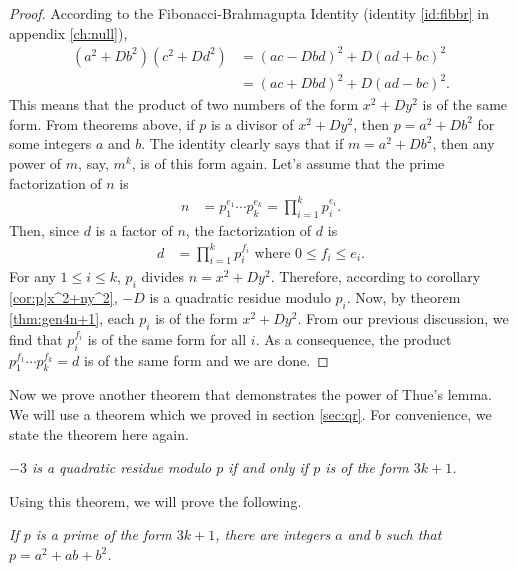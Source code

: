 \documentclass{subfile}
\begin{document}
	\begin{proof}
		According to the Fibonacci-Brahmagupta Identity (identity \autoref{id:fibbr} in appendix \autoref{ch:null}),
			\begin{align*}
				(a^2+Db^2)(c^2+Dd^2)& =(ac-Dbd)^2+D(ad+bc)^2\\
				& =(ac+Dbd)^2+D(ad-bc)^2.
			\end{align*}
		This means that the product of two numbers of the form $x^2+Dy^2$ is of the same form. From theorems above, if $p$ is a divisor of $x^2+Dy^2$, then $p=a^2+Db^2$ for some integers $a$ and $b$. The identity clearly says that if $m=a^2+Db^2$, then any power of $m$, say, $m^k$, is of this form again. Let's assume that the prime factorization of $n$ is
			\begin{align*}
				n & = p_1^{e_1}\cdots p_k^{e_k} = \prod_{i=1}^{k}p_i^{e_i}.
			\end{align*}
		Then, since $d$ is a factor of $n$, the factorization of $d$ is
			\begin{align*}
				d & = \prod_{i=1}^{k}p_i^{f_i}\text{ where }0\leq f_i\leq e_i.
			\end{align*}
		For any $1\leq i\leq k$, $p_i$ divides $n=x^2+Dy^2$. Therefore, according to corollary \autoref{cor:p|x^2+ny^2}, $-D$ is a quadratic residue modulo $p_i$. Now, by theorem \autoref{thm:gen4n+1}, each $p_i$ is of the form $x^2+Dy^2$. From our previous discussion, we find that $p_i^{f_i}$ is of the same form for all $i$. As a consequence, the product $p_1^{f_1}\cdots p_k^{f_k}=d$ is of the same form and we are done.
	\end{proof}
	Now we prove another theorem that demonstrates the power of Thue's lemma. We will use a theorem which we proved in section \autoref{sec:qr}. For convenience, we state the theorem here again.
		\begin{theorem}\slshape
			$-3$ is a quadratic residue modulo $p$ if and only if $p$ is of the form $3k+1$.
		\end{theorem}
	Using this theorem, we will prove the following.
		\begin{theorem}\slshape
			If $p$ is a prime of the form $3k+1$, there are integers $a$ and $b$ such that $p=a^2+ab+b^2$.
		\end{theorem}
	
\end{document}
